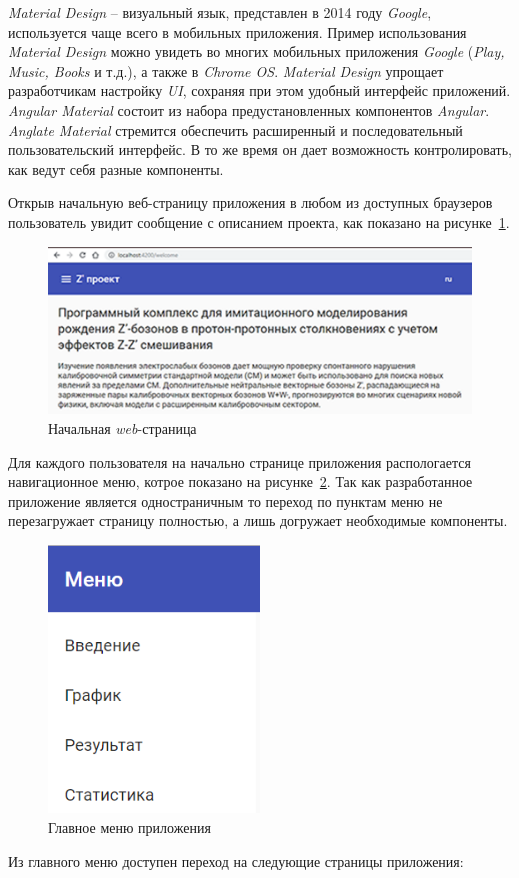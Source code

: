 \textit{Material Design} -- визуальный язык, представлен в 2014 году \textit{Google}, используется чаще всего в мобильных приложения. Пример использования \textit{Material Design} можно увидеть во многих мобильных приложения \textit{Google} (\textit{Play, Music, Books} и т.д.), а также в \textit{Chrome OS}. \textit{Material Design} упрощает разработчикам настройку \textit{UI}, сохраняя при этом удобный интерфейс приложений. \textit{Angular Material} состоит из набора предустановленных компонентов \textit{Angular}. \textit{Anglate Material} стремится обеспечить расширенный и последовательный пользовательский интерфейс. В то же время он дает возможность контролировать, как ведут себя разные компоненты.

Открыв начальную веб-страницу приложения в любом из доступных браузеров пользователь увидит сообщение с описанием проекта, как показано на рисунке~\ref{fig:welcome-page}.

\vspace{16pt}
\begin{figure}[!h]
	\centering
	\includegraphics[width=\textwidth]{figures/welcome-page.png}
	\caption{Начальная \textit{web}-страница}
	\label{fig:welcome-page}
\end{figure}

Для каждого пользователя на начально странице приложения распологается навигационное меню, котрое показано на рисунке~\ref{fig:menu}. Так как разработанное приложение является одностраничным то переход по пунктам меню не перезагружает страницу полностью, а лишь догружает необходимые компоненты.

\begin{figure}[!h]
	\centering
	\includegraphics[width=0.5\textwidth]{figures/menu.png}
	\caption{Главное меню приложения}
	\label{fig:menu}
\end{figure}
\vspace{5cm}
Из главного меню доступен переход на следующие страницы приложения: 


